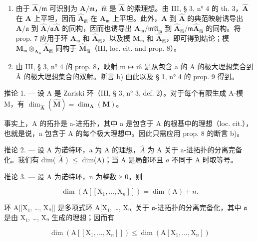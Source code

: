 \begin{enumerate}
\def\labelenumi{\alph{enumi})}
\item
  由于 \(\hat{\mathbf{A}}/\hat{\mathfrak{m}}\) 可识别为 \(\mathbf{A}/\mathfrak{m}\)，\(\hat{\mathfrak{m}}\) 是 \(\hat{\mathbf{A}}\) 的素理想。由 III, § 3, n° 4 的 th. 3，\(\hat{\mathbf{A}}\) 在 \(\mathbf{A}\) 上平坦，因而 \(\hat{\mathbf{A}}_{\hat{\mathfrak{m}}}\) 在 \(\mathbf{A}_{\mathfrak{m}}\) 上平坦。此外，\(\mathbf{A}\) 到 \(\hat{\mathbf{A}}\) 的典范映射诱导出 \(\mathbf{A}/\mathfrak{a}\) 到 \(\hat{\mathbf{A}}/\mathfrak{a}\hat{\mathbf{A}}\) 的同构，因而也诱导出 \(\mathbf{A}_{\mathfrak{m}}/\mathfrak{mA}_{\mathfrak{m}}\) 到 \(\hat{\mathbf{A}}_{\hat{\mathfrak{m}}}/\mathfrak{m}\hat{\mathbf{A}}_{\hat{\mathfrak{m}}}\) 的同构。将 prop. 7 应用于环 \(\mathbf{A}_{\mathfrak{m}}\) 和 \(\hat{\mathbf{A}}_{\hat{\mathfrak{m}}}\)，以及模 \(\mathbf{M}_{\mathfrak{m}}\) 和 \(\hat{\mathbf{A}}_{\hat{\mathfrak{m}}}\)，即可得到结论；模 \(\mathbf{M}_{\mathfrak{m}} \otimes_{\mathbf{A}_{\mathfrak{m}}} \hat{\mathbf{A}}_{\hat{\mathfrak{m}}}\) 同构于 \(\hat{\mathbf{M}}_{\hat{\mathfrak{m}}}\)（III, loc. cit. and prop. 8）。
\item
  由 III, § 3, n° 4 的 prop. 8，映射 m ↦ m̂ 是从包含 a 的 A 的极大理想集合到 Â 的极大理想集合的双射。断言 b) 由此以及 § 1, n° 4 的 prop. 9 得到。
\end{enumerate}

推论 1. --- 设 A 是 Zariski 环（III, § 3, n° 3, def. 2）。对于每个有限生成 A-模 M，有 \(\dim_{\hat{\mathbf{A}}}(\hat{\mathbf{M}}) = \dim_{\mathbf{A}}(\mathbf{M})\)。

事实上，A 的拓扑是 a-进拓扑，其中 a 是包含于 A 的根基中的理想（loc. cit.），也就是说，a 包含于 A 的每个极大理想中。因此只需应用 prop. 8 的断言 b)。

推论 2. --- 设 A 为诺特环，a 为 A 的理想，\(\hat{A}\) 为 A 关于 a-进拓扑的分离完备化。我们有 dim( \(\hat{A}\) ) \(\leqslant\) dim(A)；当 A 是局部环且 \(a\) 不同于 A 时取等号。

推论 3. --- 设 A 为诺特环，n 为整数 ≥ 0。则

\[
\dim (\mathrm{A} [ [ \mathrm{X} _ {1},..., \mathrm{X} _ {n} ] ]) = \dim (\mathrm{A}) + n.
\]

环 A{[}{[}X₁, \ldots, Xₙ{]}{]} 是多项式环 A{[}X₁, \ldots, Xₙ{]} 关于 \(\mathfrak{a}\)-进拓扑的分离完备化，其中 \(\mathfrak{a}\) 是由 X₁, \ldots, Xₙ 生成的理想；因而有

\[
\dim (\mathrm{A} [ [ \mathrm{X} _ {1},..., \mathrm{X} _ {n} ] ]) \leqslant \dim (\mathrm{A} [ \mathrm{X} _ {1},..., \mathrm{X} _ {n} ])
\]

